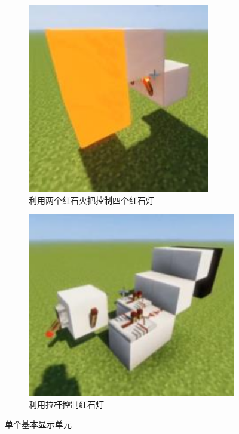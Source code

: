 \documentclass[UTF8,12pt,punct=kaiming,fontset=none]{ctexart}
\begin{document}
\begin{figure}[H]
    \centering
    \begin{subfigure}{0.2\linewidth}
        \centering
        \includegraphics[width=\linewidth]{figures/3a.png}
        \caption{利用两个红石火把控制四个红石灯}
        \label{fig:3a}
    \end{subfigure}
    \hspace{1cm}
    \begin{subfigure}{0.25\linewidth}
        \centering
        \includegraphics[width=\linewidth]{figures/3b.png}
        \caption{利用拉杆控制红石灯}
        \label{fig:3b}
    \end{subfigure}
    \caption{单个基本显示单元}
    \label{fig:3}
\end{figure}
\end{document}
